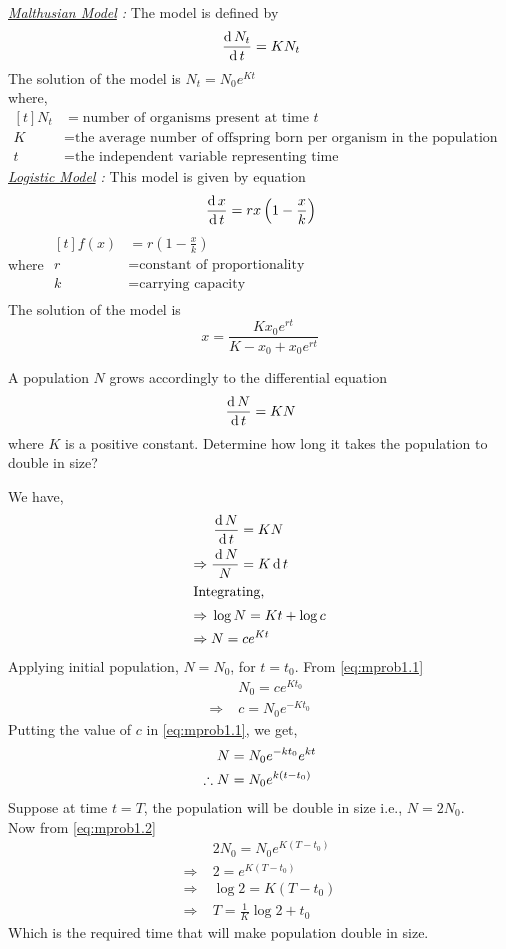 \documentclass[../main-sheet.tex]{subfiles}
\begin{document}
\emph{\underline{Malthusian Model} :} The model is defined by
\[\,\frac{\mathrm{d}\,N_t}{\mathrm{d}\,t}=KN_t\]
The solution of the model is \(N_t=N_0e^{Kt}\)\\
where, \(\begin{aligned}[t]
    N_t&=\text{number of organisms present at time }t\\
    K&=\text{the average number of offspring born per organism in the population per unit time}\\
    t&=\text{the independent variable representing time}
\end{aligned}\)\\


\noindent\emph{\underline{Logistic Model} :} This model is given by equation
\[\,\frac{\mathrm{d}\,x}{\mathrm{d}\,t}=rx\left( 1-\frac{x}{k} \right)\]
where \(\begin{aligned}[t]
    \displaystyle f(x)&=r\left( 1-\frac{x}{k} \right)\\
    r&=\text{constant of proportionality}\\
    k&=\text{carrying capacity}\\
\end{aligned}\)\\
The solution of the model is \[x=\frac{K x_0 e^{rt}}{K-x_0+x_0e^{rt}}\]
\begin{prob}
    A population \(N\) grows accordingly to the differential equation
    \[\,\frac{\mathrm{d}\,N}{\mathrm{d}\,t}=KN\]
    where \(K\) is a positive constant. Determine how long it takes the population to double in size?
\end{prob}
\begin{soln}
    We have,
    \begin{align}
        &\,\frac{\mathrm{d}\,N}{\mathrm{d}\,t}=KN\notag\\
        \Rightarrow\;&\frac{\,\mathrm{d}\, N}{N}=K\,\mathrm{d}\, t\notag\\
        \intertext{Integrating,}
        \Rightarrow\;&\log N=Kt+\log c\notag\\
        \Rightarrow\;&N=ce^{Kt}\label{eq:mprob1.1}
    \end{align}
    Applying initial population, \(N=N_0\), for \(t=t_0\). From \eqref{eq:mprob1.1}
    \begin{align*}
        &N_0=ce^{Kt_0}\\
        \Rightarrow\;&c=N_0e^{-Kt_0}
    \end{align*}
    Putting the value of \(c\) in \eqref{eq:mprob1.1}, we get,
    \begin{align}
        &N=N_0e^{-kt_0}e^{kt}\notag\\
        \therefore\;&N=N_0e^{k(t-t_0)}\label{eq:mprob1.2}
    \end{align}
    Suppose at time \(t=T\), the population will be double in size i.e., \(N=2N_0\).\\
    Now from \eqref{eq:mprob1.2}
    \begin{align*}
        &2N_0=N_0e^{K(T-t_0)}\\
        \Rightarrow\;&2=e^{K(T-t_0)}\\
        \Rightarrow\;&\log 2={K(T-t_0)}\\
        \Rightarrow\;&T=\frac{1}{K}\log 2+t_0
    \end{align*}
    Which is the required time that will make population double in size.
\end{soln}
\end{document}
